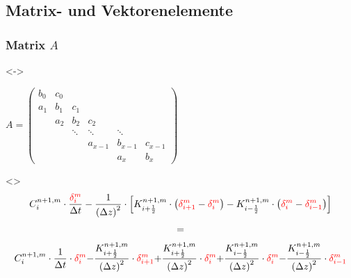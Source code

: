 \documentclass[xcolor=dvipsnames]{beamer}
\newcounter{firstElement}
\newcounter{secondElement}
\begin{document}
\subsection{Matrix- und Vektorenelemente}  

\begin{frame}[t]
  \frametitle{Matrix $A$}
  \only<\thefirstElement-\thesecondElement>{
    \centerline{
      \begin{math}
        A =
        \begin{pmatrix}
          b_0 & c_0 & & & & \\
          a_1 & b_1 & c_1 & & & \\
          & a_2 & b_2 & c_2 & & \\
          & & \ddots & \ddots & \ddots & \\
          & & & a_{x-1} & b_{x-1} & c_{x-1} \\
          & & & & a_x & b_x
        \end{pmatrix}
      \end{math}}}
  \only<\thesecondElement>{
    \begin{gather*}
      C_i^{n+1,m} \cdot \frac{\textcolor{red}{\delta_i^m}}{\Delta t} - \frac{1}{\left(\Delta z\right)^2} \cdot \left[K_{i+\frac{1}{2}}^{n+1,m} \cdot \left(\textcolor{red}{\delta_{i+1}^m} - \textcolor{red}{\delta_i^m}\right) - K_{i-\frac{1}{2}}^{n+1,m} \cdot \left(\textcolor{red}{\delta_i^m} - \textcolor{red}{\delta_{i-1}^m}\right)\right] \\[+1mm]
      = \\[+1mm]
      \textcolor{black}{C_i^{n+1,m} \cdot \frac{1}{\Delta t}} \cdot \textcolor{red}{\delta_i^m}
      \textcolor{black}{ - \frac{K_{i+\frac{1}{2}}^{n+1,m}}{\left(\Delta z\right)^2}} \cdot \textcolor{red}{\delta_{i+1}^m}
      \textcolor{black}{ + \frac{K_{i+\frac{1}{2}}^{n+1,m}}{\left(\Delta z\right)^2}} \cdot \textcolor{red}{\delta_i^m}
      \textcolor{black}{ + \frac{K_{i-\frac{1}{2}}^{n+1,m}}{\left(\Delta z\right)^2}} \cdot \textcolor{red}{\delta_i^m}
      \textcolor{black}{ - \frac{K_{i-\frac{1}{2}}^{n+1,m}}{\left(\Delta z\right)^2}} \cdot \textcolor{red}{\delta_{i-1}^m}
    \end{gather*}}


\end{frame}
\end{document}
